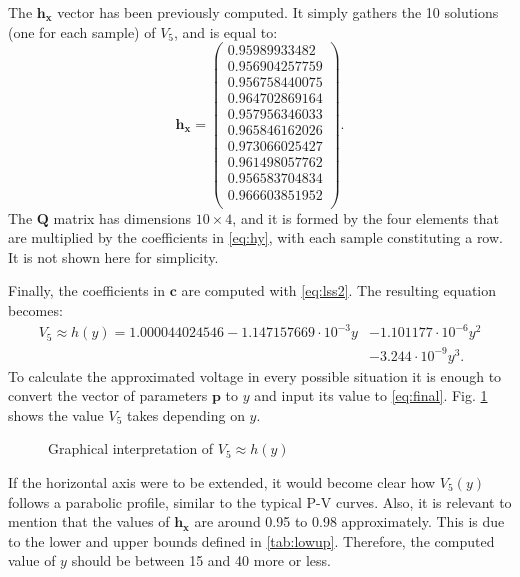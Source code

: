 The $\mathbf{h_x}$ vector has been previously computed. It simply gathers the 10 solutions (one for each sample) of $V_5$, and is equal to:
\begin{equation}
  \mathbf{h_x} = \begin{pmatrix}
0.95989933482 \\
0.956904257759 \\
0.956758440075 \\
0.964702869164 \\
0.957956346033 \\
0.965846162026 \\
0.973066025427 \\
0.961498057762 \\
0.956583704834 \\
0.966603851952 \\
  \end{pmatrix}.
  \label{eq:vech}
\end{equation}
The $\mathbf{Q}$ matrix has dimensions $10 \times 4$, and it is formed by the four elements that are multiplied by the coefficients in \eqref{eq:hy}, with each sample constituting a row. It is not shown here for simplicity. 

Finally, the coefficients in $\mathbf{c}$ are computed with \eqref{eq:lss2}. The resulting equation becomes:
\begin{equation}
  \boxed{
    \begin{split}
      V_5 \approx h(y) = 1.000044024546 -1.147157669\cdot 10^{-3} y & -1.101177\cdot 10^{-6} y^2 \\ & -3.244\cdot 10^{-9} y^3.
\end{split}
}
  \label{eq:final}
\end{equation}
To calculate the approximated voltage in every possible situation it is enough to convert the vector of parameters $\mathbf{p}$ to $y$ and input its value to \eqref{eq:final}. Fig. \ref{fig:V5y} shows the value $V_5$ takes depending on $y$. 

\begin{figure}[!htb] \centering
{}
\caption{Graphical interpretation of $V_5 \approx h(y)$}
\label{fig:V5y}
\end{figure}
If the horizontal axis were to be extended, it would become clear how $V_5(y)$ follows a parabolic profile, similar to the typical P-V curves. Also, it is relevant to mention that the values of $\mathbf{h_x}$ are around 0.95 to 0.98 approximately. This is due to the lower and upper bounds defined in \ref{tab:lowup}. Therefore, the computed value of $y$ should be between 15 and 40 more or less.

